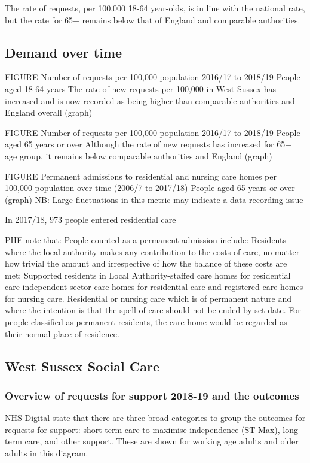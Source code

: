 The rate of requests, per 100,000 18-64 year-olds, is in line with the national rate, but the rate for 65+ remains below that of England and comparable authorities.

\subsection{Demand over time}
FIGURE Number of requests per 100,000 population 2016/17 to 2018/19 People aged 18-64 years The rate of new requests per 100,000 in West Sussex has increased and is now recorded as being higher than comparable authorities and England overall (graph)

FIGURE Number of requests per 100,000 population 2016/17 to 2018/19 People aged 65 years or over Although the rate of new requests has increased for 65+ age group, it remains below comparable authorities and England (graph)

FIGURE Permanent admissions to residential and nursing care homes per 100,000 population over time (2006/7 to 2017/18) People aged 65 years or over (graph) NB: Large fluctuations in this metric may indicate a data recording issue

In 2017/18, 973 people entered residential care

\footnotesize
PHE note that: People counted as a permanent admission include: Residents where the local authority makes any contribution to the costs of care, no matter how trivial the amount and irrespective of how the balance of these costs are met; Supported residents in Local Authority-staffed care homes for residential care independent sector care homes for residential care and registered care homes for nursing care. Residential or nursing care which is of permanent nature and where the intention is that the spell of care should not be ended by set date. For people classified as permanent residents, the care home would be regarded as their normal place of residence.
\normalsize


\subsection{West Sussex Social Care}
\subsubsection{Overview of requests for support 2018-19 and the outcomes}
NHS Digital state that there are three broad categories to group the outcomes for requests for support: short-term care to maximise independence (ST-Max), long-term care, and other support. These are shown for working age adults and older adults in this diagram.

